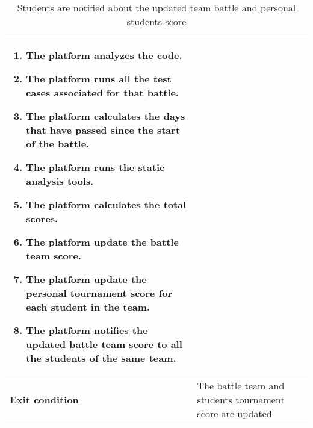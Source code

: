 \begin{enumerate}[label=\textbf{UC\arabic*}:,leftmargin=1.3cm]
\begin{table}[H]
\begin{tabular}{|l|p{11.9cm}|}
\begin{enumerate}[label=\arabic*.]
                              \item The platform analyzes the code.
                              \item The platform runs all the test cases associated for that battle.
                              \item The platform calculates the days that have passed since the start of the battle.
                              \item The platform runs the static analysis tools.
                              \item The platform calculates the total scores.
                              \item The platform update the battle team score.
                              \item The platform update the personal tournament score for each student in the team.
                              \item The platform notifies the updated battle team score to all the students of the same team.
                        \end{enumerate} \\\hline
                        \textbf{Exit condition}  & The battle team and students tournament score are updated                              \\\hline
                  \end{tabular}
                  \caption{Students are notified about the updated team battle and personal students score}
                  \label{table:Students are notified about the updated team battle and personal students score}
            \end{table}


\end{enumerate}
